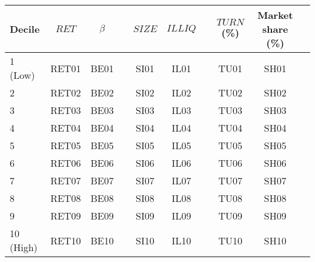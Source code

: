 \begin{tabular}{@{}lccccccccc@{}}
	\toprule
	Decile & $\textit{RET}$ & $\beta$ && $\textit{SIZE}$ & $\textit{ILLIQ}$ && $\textit{TURN}$ (\%) & Market share (\%) \\ \midrule
1 (Low) & RET01 & BE01 && SI01 & IL01 && TU01 & SH01 \\
2       & RET02 & BE02 && SI02 & IL02 && TU02 & SH02 \\
3       & RET03 & BE03 && SI03 & IL03 && TU03 & SH03 \\
4       & RET04 & BE04 && SI04 & IL04 && TU04 & SH04 \\
5       & RET05 & BE05 && SI05 & IL05 && TU05 & SH05 \\
6       & RET06 & BE06 && SI06 & IL06 && TU06 & SH06 \\
7       & RET07 & BE07 && SI07 & IL07 && TU07 & SH07 \\
8       & RET08 & BE08 && SI08 & IL08 && TU08 & SH08 \\
9       & RET09 & BE09 && SI09 & IL09 && TU09 & SH09 \\
10 (High) & RET10 & BE10 && SI10 & IL10 && TU10 & SH10 \\
	\bottomrule
\end{tabular}
